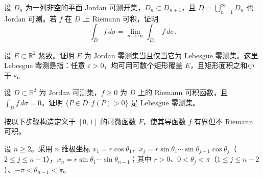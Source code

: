 \noindent\begin{minipage}{\textwidth}
设 $D_n$ 为一列非空的平面 Jordan 可测开集，$D_n\subset D_{n+1}$，且 $D=\bigcup_{n=1}^{\infty}D_n$ 也 Jordan 可测。若 $f$ 在 $D$ 上 Riemann 可积，证明\[\int_D f\,d\sigma=\lim_{n\to\infty}\int_{D_n}f\,d\sigma.\]
\end{minipage}\par\vfill
\noindent\begin{minipage}{\textwidth}
设 $E\subset\mathbb R^2$ 紧致。证明 $E$ 为 Jordan 零测集当且仅当它为 Lebesgue 零测集。这里 Lebesgue 零测是指：任意 $\varepsilon>0$，均可用可数个矩形覆盖 $E$，且矩形面积之和小于 $\varepsilon$。
\end{minipage}\par\vfill
\newpage
\noindent\begin{minipage}{\textwidth}
设 $D\subset\mathbb R^2$ 为 Jordan 可测集，$f\ge0$ 为 $D$ 上的 Riemann 可积函数，且 $\int_D f\,d\sigma=0$。证明 $\{P\in D:f(P)>0\}$ 是 Lebesgue 零测集。
\end{minipage}\par\vfill
\newpage
\noindent\begin{minipage}{\textwidth}
按以下步骤构造定义于 $[0,1]$ 的可微函数 $F$，使其导函数 $f$ 有界但不 Riemann 可积。
\end{minipage}\par\vfill
\newpage
\noindent\begin{minipage}{\textwidth}
设 $n\ge2$。采用 $n$ 维极坐标 $x_1=r\cos\theta_1$，$x_j=r\sin\theta_1\cdots\sin\theta_{j-1}\cos\theta_j$（$2\le j\le n-1$），$x_n=r\sin\theta_1\cdots\sin\theta_{n-1}$；其中 $r>0$、$0<\theta_j<\pi$（$1\le j\le n-2$）、$-\pi<\theta_{n-1}<\pi$。
\end{minipage}\par\vfill
